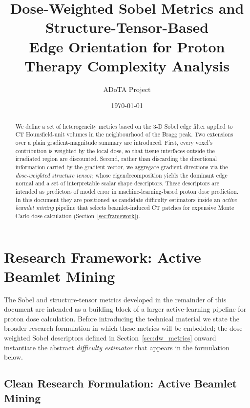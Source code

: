 \documentclass[11pt,a4paper]{article}
\title{Dose-Weighted Sobel Metrics and Structure-Tensor-Based\\
       Edge Orientation for Proton Therapy Complexity Analysis}
\author{ADoTA Project}
\date{\today}
\begin{document}
\maketitle

\begin{abstract}
We define a set of heterogeneity metrics based on the 3-D Sobel edge filter
applied to CT Hounsfield-unit volumes in the neighbourhood of the Bragg peak.
Two extensions over a plain gradient-magnitude summary are introduced.
First, every voxel's contribution is weighted by the local dose, so that tissue
interfaces outside the irradiated region are discounted.
Second, rather than discarding the directional information carried by the
gradient vector, we aggregate gradient directions via the \emph{dose-weighted
structure tensor}, whose eigendecomposition yields the dominant edge normal and
a set of interpretable scalar shape descriptors.
These descriptors are intended as predictors of model error in
machine-learning-based proton dose prediction.
In this document they are positioned as candidate difficulty estimators inside
an \emph{active beamlet mining} pipeline that selects beamlet-induced CT
patches for expensive Monte Carlo dose calculation
(Section~\ref{sec:framework}).
\end{abstract}

\tableofcontents
\newpage

\section{Research Framework: Active Beamlet Mining}
\label{sec:framework}

The Sobel and structure-tensor metrics developed in the remainder of this
document are intended as a building block of a larger active-learning
pipeline for proton dose calculation.
Before introducing the technical material we state the broader research
formulation in which these metrics will be embedded; the dose-weighted
Sobel descriptors defined in
Section~\ref{sec:dw_metrics} onward instantiate the abstract
\emph{difficulty estimator} that appears in the formulation below.

\subsection{Clean Research Formulation: Active Beamlet Mining}
\end{document}
